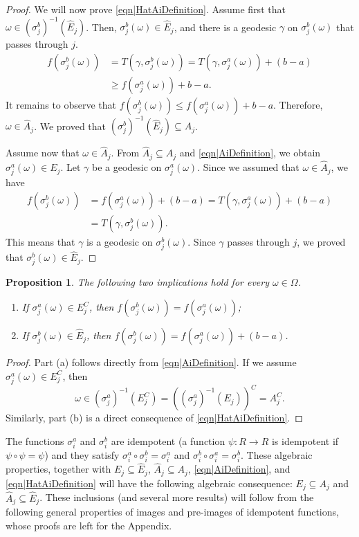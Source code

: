 \documentclass[reqno]{amsart}
\newtheorem{proposition}{Proposition}
\begin{document}
\begin{proof}
 We will now prove \eqref{eqn|HatAiDefinition}. Assume first that $\omega\in \left(\sigma_j^b\right)^{-1}(\hat E_j)$. Then, $\sigma_j^b(\omega)\in \hat E_j$, and there is a geodesic $\gamma$ 
on $\sigma_j^b(\omega)$ that passes through $j$.  \begin{align*}
f(\sigma_j^b(\omega))&=T(\gamma,\sigma_j^b(\omega))=T(\gamma,\sigma_j^a(\omega))+(b-a)\\ &\geq f(\sigma_j^a(\omega))+b-a.
\end{align*}
It remains to observe that  
$f(\sigma_j^b(\omega))\leq f(\sigma_j^a(\omega))+ b-a$. Therefore, $\omega\in \hat A_j$. We proved that 
$\left(\sigma_j^b\right)^{-1}(\hat E_j)\subseteq \hat A_j$. 

Assume now that $\omega\in \hat A_j$. From $\hat A_j\subseteq A_j$ and \eqref{eqn|AiDefinition}, we obtain $\sigma_j^a(\omega)\in E_j$. Let $\gamma$ be a geodesic on $\sigma_j^a(\omega)$. Since we assumed that $\omega\in \hat A_j$, we have 
\begin{align*}
f(\sigma_j^b(\omega))&=f(\sigma_j^a(\omega))+(b-a)=T(\gamma,\sigma_j^a(\omega))+(b-a)\\
&=T(\gamma,\sigma_j^b(\omega)).
\end{align*}
This means that $\gamma$ is a geodesic on $\sigma_j^b(\omega)$. Since $\gamma$ passes through $j$, we proved that $\sigma_j^b(\omega)\in \hat E_j$. 
\end{proof}
  
\begin{proposition}\label{thm|forComputer} The following two implications hold for every $\omega\in\Omega$.
\begin{enumerate}
\item[(a)] If $\sigma_j^a(\omega)\in E_j^C$, then $f(\sigma_j^b(\omega))=f(\sigma_j^a(\omega))$;
\item[(b)] If $\sigma_j^b(\omega)\in \hat E_j$, then $f(\sigma_j^b(\omega))=f(\sigma_j^a(\omega))+(b-a)$.
\end{enumerate}
\end{proposition}
\begin{proof}
Part (a) follows directly from \eqref{eqn|AiDefinition}. If we assume $\sigma_j^a(\omega)\in E_j^C$, then \[\omega\in (\sigma_j^a)^{-1}(E_j^C)=
\left((\sigma_j^a)^{-1}(E_j)\right)^C=A_j^C.\] Similarly, part (b) is a direct consequence of \eqref{eqn|HatAiDefinition}. 
\end{proof} 


The functions $\sigma_i^a$ and $\sigma_i^b$ are idempotent (a function $\psi:R\to R$ is idempotent if $\psi\circ \psi=\psi$) and they satisfy $\sigma_i^a\circ\sigma_i^b=\sigma_i^a$ and $\sigma_i^b\circ\sigma_i^a=\sigma_i^b$.
These algebraic properties, together with $E_j\subseteq \hat E_j$, $\hat A_j\subseteq A_j$, \eqref{eqn|AiDefinition}, and
 \eqref{eqn|HatAiDefinition} will have the following algebraic consequence: $E_j\subseteq A_j$ and $\hat A_j\subseteq \hat E_j$.
These inclusions (and several more results) will follow from the following general properties of images and pre-images of idempotent functions, whose proofs 
are left for the Appendix.
\end{document}
